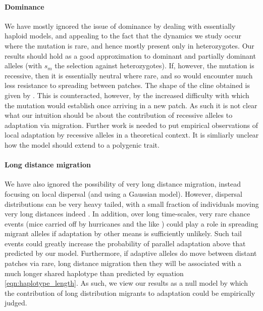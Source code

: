 \documentclass{article}
\newcommand{\citep}[1]{\cite{#1}}
\newcommand{\citet}[1]{\cite{#1}}
\begin{document}
\paragraph{Dominance}
We have mostly ignored the issue of dominance 
by dealing with essentially haploid models,
and appealing to the fact that the dynamics we study occur where the mutation is rare,
and hence mostly present only in heterozygotes. 
Our results should hold as a good approximation to dominant and partially dominant alleles
(with $s_m$ the selection against heterozygotes).
If, however, the mutation is recessive, then it is essentially neutral where rare,
and so would encounter much less resistance to spreading between patches.
The shape of the cline obtained is given by \citet{haldane1948theory}.
This is counteracted, however, by the increased difficulty with which the mutation would establish
once arriving in a new patch. 
As such it is not clear what our intuition should be 
about the contribution of recessive alleles to adaptation via migration. 
Further work is needed to put empirical observations of local adaptation by recessive alleles 
in a theoretical context.
It is simliarly unclear how the model should extend to a polygenic trait.

\paragraph{Long distance migration}
We have also ignored the possibility of very long distance migration,
instead focusing on local dispersal (and using a Gaussian model).
However, dispersal distributions can be very heavy tailed, 
with a small fraction of individuals moving very long distances indeed \citep{levin2003ecology,reynolds2009levy}.
In addition, over long time-scales, very rare chance events (mice carried off by hurricanes and the like \citet{censky1998overwater,nathan2008mechanisms})
could play a role in spreading migrant alleles if adaptation by other means is sufficiently unlikely.
Such tail events could greatly increase the probability of parallel adaptation above that predicted by our model. 
Furthermore, if adaptive alleles do move between distant patches via rare, long distance migration 
then they will be associated with a much longer shared haplotype than predicted by equation \eqref{eqn:haplotype_length}. 
As such, we view our results as a null model by which the contribution of long distribution migrants to adaptation could be empirically judged.   
\end{document}
